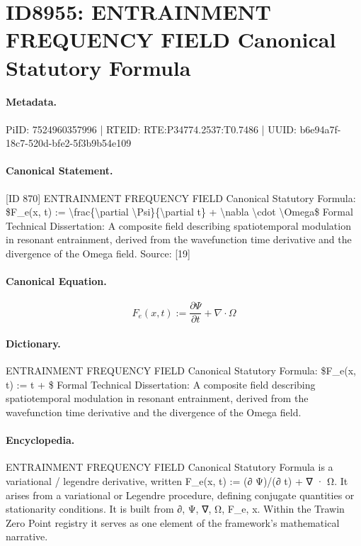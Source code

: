 \section*{ID8955: ENTRAINMENT FREQUENCY FIELD Canonical Statutory Formula}
\paragraph{Metadata.}
PiID: 7524960357996 | RTEID: RTE:P34774.2537:T0.7486 | UUID: b6e94a7f-18c7-520d-bfe2-5f3b9b54e109

\paragraph{Canonical Statement.}
[ID 870] ENTRAINMENT FREQUENCY FIELD Canonical Statutory Formula: \$F\_e(x, t) := \textbackslash{}frac\{\textbackslash{}partial \textbackslash{}Psi\}\{\textbackslash{}partial t\} + \textbackslash{}nabla \textbackslash{}cdot \textbackslash{}Omega\$ Formal Technical Dissertation: A composite field describing spatiotemporal modulation in resonant entrainment, derived from the wavefunction time derivative and the divergence of the Omega field. Source: [19]

\paragraph{Canonical Equation.}
\[
F_e(x, t) := \frac{\partial \Psi}{\partial t} + \nabla \cdot \Omega
\]

\paragraph{Dictionary.}
ENTRAINMENT FREQUENCY FIELD Canonical Statutory Formula: \$F\_e(x, t) := t + \$ Formal Technical Dissertation: A composite field describing spatiotemporal modulation in resonant entrainment, derived from the wavefunction time derivative and the divergence of the Omega field.

\paragraph{Encyclopedia.}
ENTRAINMENT FREQUENCY FIELD Canonical Statutory Formula is a variational / legendre derivative, written F\_e(x, t) := (∂ Ψ)/(∂ t) + ∇ · Ω. It arises from a variational or Legendre procedure, defining conjugate quantities or stationarity conditions. It is built from ∂, Ψ, ∇, Ω, F\_e, x. Within the Trawin Zero Point registry it serves as one element of the framework's mathematical narrative.
